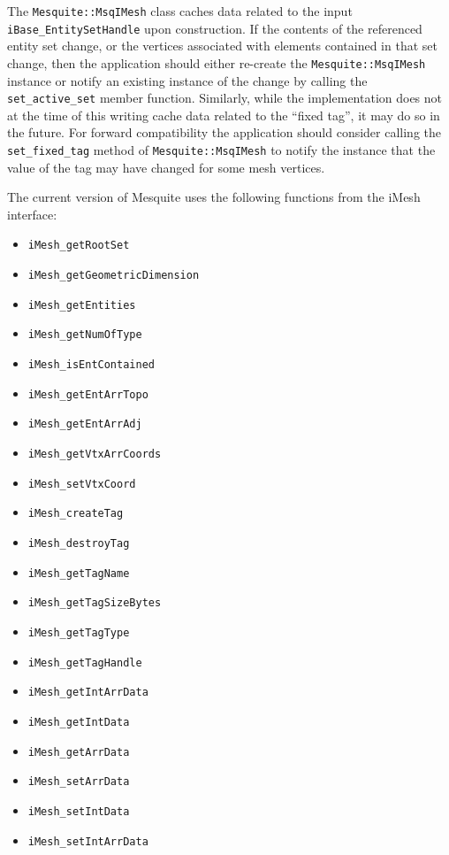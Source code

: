 The \texttt{Mesquite::MsqIMesh} class caches data related to the input \texttt{iBase\_EntitySetHandle} upon construction.  If the contents of the referenced entity set change, or the vertices associated with elements contained in that set change, then the application should either re-create the \texttt{Mesquite::MsqIMesh} instance or notify an existing instance of the change by calling the \texttt{set\_active\_set} member function.  Similarly, while the implementation does not at the time of this writing cache data related to the ``fixed tag'', it may do so in the future.  For forward compatibility the application should consider calling the \texttt{set\_fixed\_tag} method of \texttt{Mesquite::MsqIMesh} to notify the instance that the value of the tag may have changed for some mesh vertices.

The current version of Mesquite uses the following functions from the iMesh interface:
\begin{itemize}
\item \texttt{iMesh\_getRootSet}
\item \texttt{iMesh\_getGeometricDimension}
\item \texttt{iMesh\_getEntities}
\item \texttt{iMesh\_getNumOfType}
\item \texttt{iMesh\_isEntContained}
\item \texttt{iMesh\_getEntArrTopo}
\item \texttt{iMesh\_getEntArrAdj}
\item \texttt{iMesh\_getVtxArrCoords}
\item \texttt{iMesh\_setVtxCoord}
\item \texttt{iMesh\_createTag}
\item \texttt{iMesh\_destroyTag}
\item \texttt{iMesh\_getTagName}
\item \texttt{iMesh\_getTagSizeBytes}
\item \texttt{iMesh\_getTagType}
\item \texttt{iMesh\_getTagHandle}
\item \texttt{iMesh\_getIntArrData}
\item \texttt{iMesh\_getIntData}
\item \texttt{iMesh\_getArrData}
\item \texttt{iMesh\_setArrData}
\item \texttt{iMesh\_setIntData}
\item \texttt{iMesh\_setIntArrData}
\end{itemize}

